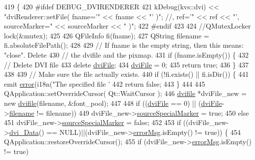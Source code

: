 \begin{DoxyCode}
419 \{
420 \textcolor{preprocessor}{#ifdef DEBUG\_DVIRENDERER}
421   kDebug(kvs::dvi) << \textcolor{stringliteral}{"dviRenderer::setFile( fname='"} << fname << \textcolor{stringliteral}{"' )"}; \textcolor{comment}{//, ref='" << ref << "',
       sourceMarker=" << sourceMarker << " )";}
422 \textcolor{preprocessor}{#endif}
423 
424   \textcolor{comment}{//QMutexLocker lock(&mutex);}
425 
426   QFileInfo fi(fname);
427   QString   filename = fi.absoluteFilePath();
428 
429   \textcolor{comment}{// If fname is the empty string, then this means: "close". Delete}
430   \textcolor{comment}{// the dvifile and the pixmap.}
431   \textcolor{keywordflow}{if} (fname.isEmpty()) \{
432     \textcolor{comment}{// Delete DVI file}
433     \textcolor{keyword}{delete} \hyperlink{classdviRenderer_a67ded13a1a8da343aa0ee921ed96d4c2}{dviFile};
434     \hyperlink{classdviRenderer_a67ded13a1a8da343aa0ee921ed96d4c2}{dviFile} = 0;
435     \textcolor{keywordflow}{return} \textcolor{keyword}{true};
436   \}
437 
438 
439   \textcolor{comment}{// Make sure the file actually exists.}
440   \textcolor{keywordflow}{if} (!fi.exists() || fi.isDir()) \{
441     emit \hyperlink{classdviRenderer_ac3e658a3f6b99c724413fc1f5663f976}{error}(i18n(\textcolor{stringliteral}{"The specified file '%
442     \textcolor{keywordflow}{return} \textcolor{keyword}{false};
443   \}
444 
445   QApplication::setOverrideCursor( Qt::WaitCursor );
446   \hyperlink{classdvifile}{dvifile} *dviFile\_new = \textcolor{keyword}{new} \hyperlink{classdvifile}{dvifile}(filename, &font\_pool);
447 
448   \textcolor{keywordflow}{if} ((\hyperlink{classdviRenderer_a67ded13a1a8da343aa0ee921ed96d4c2}{dviFile} == 0) || (\hyperlink{classdviRenderer_a67ded13a1a8da343aa0ee921ed96d4c2}{dviFile}->\hyperlink{classdvifile_a1c0fe420231e71f256b5db367b7e1178}{filename} != filename))
449     dviFile\_new->\hyperlink{classdvifile_a3121bb4c368ca1d30949cffb1df44d81}{sourceSpecialMarker} = \textcolor{keyword}{true};
450   \textcolor{keywordflow}{else}
451     dviFile\_new->\hyperlink{classdvifile_a3121bb4c368ca1d30949cffb1df44d81}{sourceSpecialMarker} = \textcolor{keyword}{false};
452 
453   \textcolor{keywordflow}{if} ((dviFile\_new->\hyperlink{classdvifile_a81f1d32c52377a7b1802072eb40998b7}{dvi\_Data}() == NULL)||(dviFile\_new->\hyperlink{classdvifile_a57d83b062272da49940bb34863d0b595}{errorMsg}.isEmpty() != \textcolor{keyword}{true})) \{
454     QApplication::restoreOverrideCursor();
455     \textcolor{keywordflow}{if} (dviFile\_new->\hyperlink{classdvifile_a57d83b062272da49940bb34863d0b595}{errorMsg}.isEmpty() != \textcolor{keyword}{true})
}
\end{DoxyCode}
